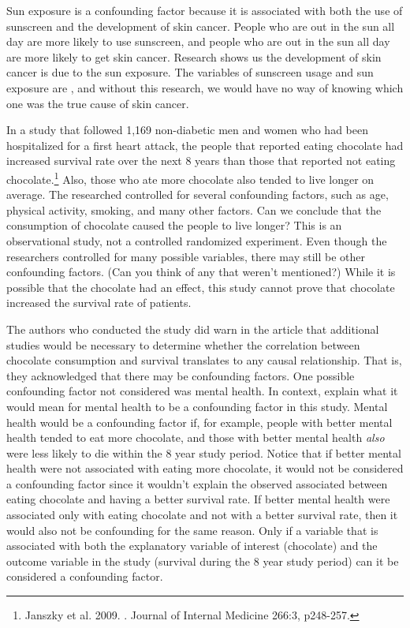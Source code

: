 Sun exposure is a confounding factor because it is associated with both the use of sunscreen and the development of skin cancer. People who are out in the sun all day are more likely to use sunscreen, and people who are out in the sun all day are more likely to get skin cancer. Research shows us the development of skin cancer is due to the sun exposure. The variables of sunscreen usage and sun exposure are , and without this research, we would have no way of knowing which one was the true cause of skin cancer.

\begin{example}{In a study that followed 1,169 non-diabetic men and women who had been hospitalized for a first heart attack, the people that reported eating chocolate had increased survival rate over the next 8 years than those that reported not eating chocolate.\footnote{Janszky et al. 2009. . Journal of Internal Medicine 266:3, p248-257.} Also, those who ate more chocolate also tended to live longer on average. The researched controlled for several confounding factors, such as age, physical activity, smoking, and many other factors. Can we conclude that the consumption of chocolate caused the people to live longer?} \label{confounding_2008_chocolate_health_study}
This is an observational study, not a controlled randomized experiment. Even though the researchers controlled for many possible variables, there may still be other confounding factors. (Can you think of any that weren't mentioned?) While it is possible that the chocolate had an effect, this study cannot prove that chocolate increased the survival rate of patients.
\end{example}

\begin{example}{The authors who conducted the study did warn in the article that additional studies would be necessary to determine whether the correlation between chocolate consumption and survival translates to any causal relationship. That is, they acknowledged that there may be confounding factors. One possible confounding factor not considered was mental health. In context, explain what it would mean for mental health to be a confounding factor in this study.}
Mental health would be a confounding factor if, for example, people with better mental health tended to eat more chocolate, and those with better mental health \emph{also} were less likely to die within the 8 year study period. Notice that if better mental health were not associated with eating more chocolate, it would not be considered a confounding factor since it wouldn't explain the observed associated between eating chocolate and having a better survival rate. If better mental health were associated only with eating chocolate and not with a better survival rate, then it would also not be confounding for the same reason. Only if a variable that is associated with both the explanatory variable of interest (chocolate) and the outcome variable in the study (survival during the 8 year study period) can it be considered a confounding factor.
\end{example}

